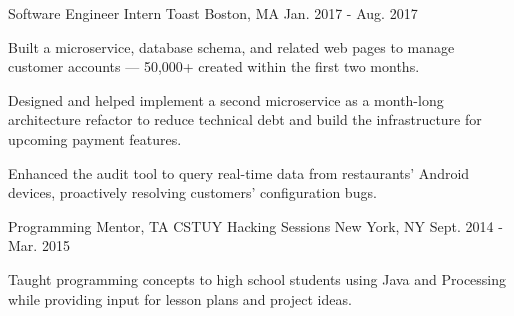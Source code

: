 \begin{cventries}
  \cventry
    {Software Engineer Intern} %
    {Toast} %
    {Boston, MA} %
    {Jan. 2017 - Aug. 2017} %
    {
      \begin{cvitems} %
        \item {Built a microservice, database schema, and related web pages to manage customer accounts --- 50,000+ created within the first two months.}
		\item {Designed and helped implement a second microservice as a month-long architecture refactor to reduce technical debt and build the infrastructure for upcoming payment features.}
		\item {Enhanced the audit tool to query real-time data from restaurants' Android devices, proactively resolving customers' configuration bugs.}
      \end{cvitems}
    }

  \cventry
    {Programming Mentor, TA} %
    {CSTUY Hacking Sessions} %
    {New York, NY} %
    {Sept. 2014 - Mar. 2015} %
    {
      \begin{cvitems} %
        \item {Taught programming concepts to high school students using Java and Processing while providing input for lesson plans and project ideas.}
      \end{cvitems}
    }    
\end{cventries}
